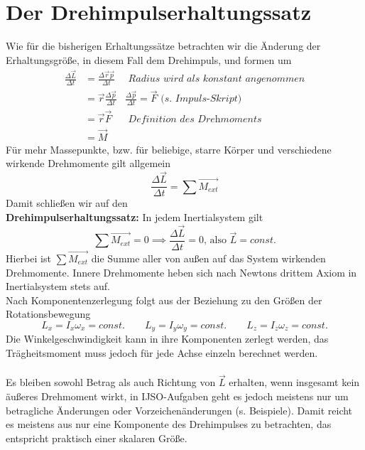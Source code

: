 \documentclass[11pt]{article}
\begin{document}
\section{Der Drehimpulserhaltungssatz}
Wie für die bisherigen Erhaltungssätze betrachten wir die Änderung der Erhaltungsgröße, in diesem Fall dem Drehimpuls, und formen um 
\begin{align*}
        \frac{\Delta \vec{L}}{\Delta t} &= \frac{\Delta \vec{r}\vec{p}}{\Delta t} &\textit{ Radius wird als konstant angenommen} \\
        &= \vec{r}\frac{\Delta \vec{p}}{\Delta t} &\frac{\Delta \vec{p}}{\Delta t} = \vec{F} \textit{ (s. Impuls-Skript)} \\ 
        &= \vec{r}\vec{F} &\textit{ Definition des Drehmoments} \\
        &= \vec{M}
\end{align*}
Für mehr Massepunkte, bzw. für beliebige, starre Körper und verschiedene wirkende Drehmomente gilt allgemein
\begin{equation*}
        \frac{\Delta \vec{L}}{\Delta t} = \sum \vec{M_{ext}}
\end{equation*}
Damit schließen wir auf den \\
\textbf{Drehimpulserhaltungssatz:} In jedem Inertialsystem gilt 
\begin{equation*}
        \sum \vec{M_{ext}} = 0 \implies \frac{\Delta \vec{L}}{\Delta t} = 0 \text{, also } \vec{L} = const. 
\end{equation*}
Hierbei ist $\sum \vec{M_{ext}}$ die Summe aller von außen auf das System wirkenden Drehmomente. Innere Drehmomente heben sich nach Newtons drittem Axiom in Inertialsystem stets auf. \\
Nach Komponentenzerlegung folgt aus der Beziehung zu den Größen der Rotationsbewegung 
\begin{equation*}
        L_x = I_x\omega_x = const. \quad\quad L_y = I_y\omega_y = const. \quad\quad L_z = I_z\omega_z = const. 
\end{equation*} 
Die Winkelgeschwindigkeit kann in ihre Komponenten zerlegt werden, das Trägheitsmoment muss jedoch für jede Achse einzeln berechnet werden. \\\\
Es bleiben sowohl Betrag als auch Richtung von $\vec{L}$ erhalten, wenn insgesamt kein äußeres Drehmoment wirkt, in IJSO-Aufgaben geht es jedoch meistens nur um betragliche Änderungen oder Vorzeichenänderungen (s. Beispiele). Damit reicht es meistens aus nur eine Komponente des Drehimpulses zu betrachten, das entspricht praktisch einer skalaren Größe. 
\end{document}
